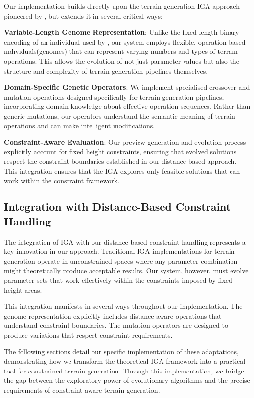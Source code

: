Our implementation builds directly upon the terrain generation IGA approach pioneered by \textcite{Walsh10}, but extends it in several critical ways:

\textbf{Variable-Length Genome Representation}: Unlike the fixed-length binary encoding of an individual used by \textcite{Walsh10}, our system employs flexible, operation-based individuals(genomes) that can represent varying numbers and types of terrain operations. This allows the evolution of not just parameter values but also the structure and complexity of terrain generation pipelines themselves.

\textbf{Domain-Specific Genetic Operators}: We implement specialised crossover and mutation operations designed specifically for terrain generation pipelines, incorporating domain knowledge about effective operation sequences. Rather than generic mutations, our operators understand the semantic meaning of terrain operations and can make intelligent modifications.

\textbf{Constraint-Aware Evaluation}: Our preview generation and evolution process explicitly account for fixed height constraints, ensuring that evolved solutions respect the constraint boundaries established in our distance-based approach. This integration ensures that the IGA explores only feasible solutions that can work within the constraint framework.

\subsection{Integration with Distance-Based Constraint Handling}

The integration of IGA with our distance-based constraint handling represents a key innovation in our approach. Traditional IGA implementations for terrain generation operate in unconstrained spaces where any parameter combination might theoretically produce acceptable results. Our system, however, must evolve parameter sets that work effectively within the constraints imposed by fixed height areas.

This integration manifests in several ways throughout our implementation. The genome representation explicitly includes distance-aware operations that understand constraint boundaries. The mutation operators are designed to produce variations that respect constraint requirements.

The following sections detail our specific implementation of these adaptations, demonstrating how we transform the theoretical IGA framework into a practical tool for constrained terrain generation. Through this implementation, we bridge the gap between the exploratory power of evolutionary algorithms and the precise requirements of constraint-aware terrain generation.

